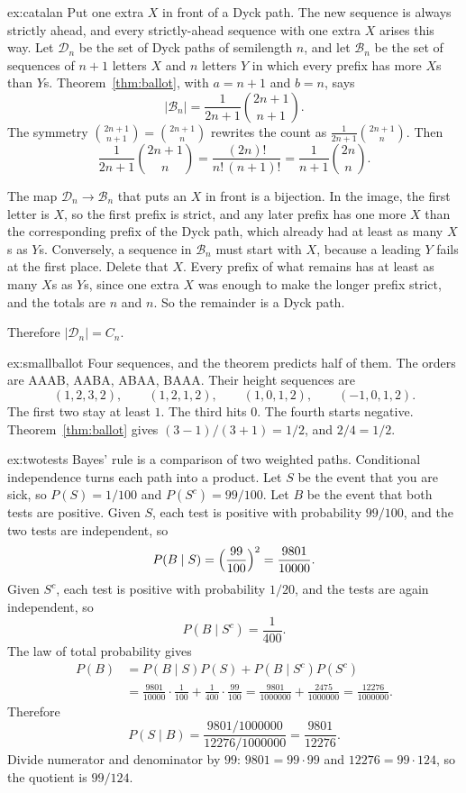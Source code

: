 \begin{solution}{ex:catalan}
\idea Put one extra $X$ in front of a Dyck path. The new sequence is always strictly ahead, and every strictly-ahead sequence with one extra $X$ arises this way.
\writeup Let $\mathcal D_n$ be the set of Dyck paths of semilength $n$, and let $\mathcal B_n$ be the set of sequences of $n+1$ letters $X$ and $n$ letters $Y$ in which every prefix has more $X$s than $Y$s. Theorem~\ref{thm:ballot}, with $a=n+1$ and $b=n$, says
\[
 |\mathcal B_n|=\frac{1}{2n+1}\binom{2n+1}{n+1}.
\]
The symmetry $\binom{2n+1}{n+1}=\binom{2n+1}{n}$ rewrites the count as $\frac1{2n+1}\binom{2n+1}{n}$. Then
\[
 \frac1{2n+1}\binom{2n+1}{n}=\frac{(2n)!}{n!\,(n+1)!}=\frac1{n+1}\binom{2n}{n}.
\]

The map $\mathcal D_n\to\mathcal B_n$ that puts an $X$ in front is a bijection. In the image, the first letter is $X$, so the first prefix is strict, and any later prefix has one more $X$ than the corresponding prefix of the Dyck path, which already had at least as many $X$s as $Y$s. Conversely, a sequence in $\mathcal B_n$ must start with $X$, because a leading $Y$ fails at the first place. Delete that $X$. Every prefix of what remains has at least as many $X$s as $Y$s, since one extra $X$ was enough to make the longer prefix strict, and the totals are $n$ and $n$. So the remainder is a Dyck path.

Therefore $|\mathcal D_n|=C_n$.
\end{solution}

\begin{solution}{ex:smallballot}
\idea Four sequences, and the theorem predicts half of them.
\writeup The orders are AAAB, AABA, ABAA, BAAA. Their height sequences are
\[
 (1,2,3,2),\qquad (1,2,1,2),\qquad (1,0,1,2),\qquad (-1,0,1,2).
\]
The first two stay at least $1$. The third hits $0$. The fourth starts negative. Theorem~\ref{thm:ballot} gives $(3-1)/(3+1)=1/2$, and $2/4=1/2$.
\end{solution}


\begin{solution}{ex:twotests}
\idea Bayes' rule is a comparison of two weighted paths. Conditional independence turns each path into a product.
\writeup Let $S$ be the event that you are sick, so $P(S)=1/100$ and $P(S^c)=99/100$. Let $B$ be the event that both tests are positive. Given $S$, each test is positive with probability $99/100$, and the two tests are independent, so
\[
 P(B\mid S)=\Bigl(\frac{99}{100}\Bigr)^2=\frac{9801}{10000}.
\]
Given $S^c$, each test is positive with probability $1/20$, and the tests are again independent, so
\[
 P(B\mid S^c)=\frac1{400}.
\]
The law of total probability gives
\begin{align*}
 P(B)
 &=P(B\mid S)P(S)+P(B\mid S^c)P(S^c)\\
 &=\frac{9801}{10000}\cdot\frac1{100}+\frac1{400}\cdot\frac{99}{100}
 =\frac{9801}{1000000}+\frac{2475}{1000000}
 =\frac{12276}{1000000}.
\end{align*}
Therefore
\[
 P(S\mid B)=\frac{9801/1000000}{12276/1000000}=\frac{9801}{12276}.
\]
Divide numerator and denominator by $99$: $9801=99\cdot99$ and $12276=99\cdot124$, so the quotient is $99/124$.
\end{solution}

